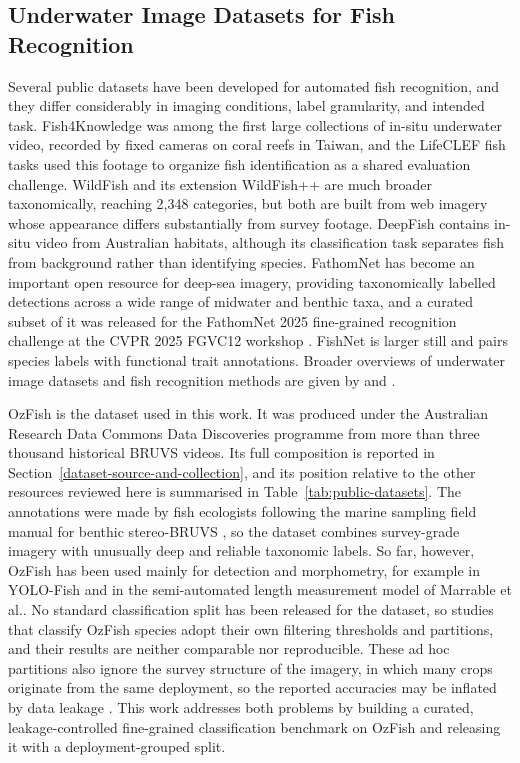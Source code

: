 \documentclass[preprint,12pt]{elsarticle}
\begin{document}
\subsection{Underwater Image Datasets for Fish
Recognition}\label{underwater-image-datasets-for-fish-recognition}

Several public datasets have been developed for automated fish
recognition, and they differ considerably in imaging conditions, label
granularity, and intended task. Fish4Knowledge
\citep{ref3} was among the first large
collections of in-situ underwater video, recorded by fixed cameras on
coral reefs in Taiwan, and the LifeCLEF fish tasks
\citep{ref27} used this footage to organize fish
identification as a shared evaluation challenge. WildFish
\citep{ref28} and its extension WildFish++
\citep{ref29} are much broader taxonomically,
reaching 2,348 categories, but both are built from web imagery whose
appearance differs substantially from survey footage. DeepFish
\citep{ref9} contains in-situ video from
Australian habitats, although its classification task separates fish
from background rather than identifying species. FathomNet
\citep{ref30} has become an important open
resource for deep-sea imagery, providing taxonomically labelled
detections across a wide range of midwater and benthic taxa, and a
curated subset of it was released for the FathomNet 2025 fine-grained
recognition challenge at the CVPR 2025 FGVC12 workshop
\citep{ref30}. FishNet
\citep{ref10} is larger still and pairs species
labels with functional trait annotations. Broader overviews of
underwater image datasets and fish recognition methods are given by
\citet{ref5} and \citet{ref6} .

OzFish \citep{ref22} is the dataset used in this
work. It was produced under the Australian Research Data Commons Data
Discoveries programme from more than three thousand historical BRUVS
videos. Its full composition is reported in Section~\ref{dataset-source-and-collection}, and its
position relative to the other resources reviewed here is summarised in
Table~\ref{tab:public-datasets}. The annotations were made by fish ecologists following the
marine sampling field manual for benthic stereo-BRUVS
\citep{ref4}, so the dataset combines
survey-grade imagery with unusually deep and reliable taxonomic labels.
So far, however, OzFish has been used mainly for detection and
morphometry, for example in YOLO-Fish
\citep{ref7} and in the semi-automated length
measurement model of Marrable et
al.\citep{ref19}. No standard classification
split has been released for the dataset, so studies that classify OzFish
species adopt their own filtering thresholds and partitions, and their
results are neither comparable nor reproducible. These ad hoc partitions
also ignore the survey structure of the imagery, in which many crops
originate from the same deployment, so the reported accuracies may be
inflated by data leakage \citep{ref17,ref20}. This work addresses both problems
by building a curated, leakage-controlled fine-grained classification
benchmark on OzFish and releasing it with a deployment-grouped split.
\end{document}

